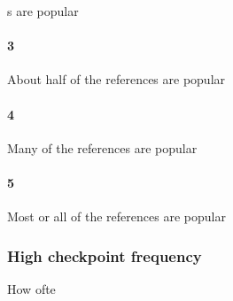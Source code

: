 s are popular\paragraph{3}About half of the references are popular\paragraph{4}Many of the references are popular\paragraph{5}Most or all of the references are popular\subsubsection{High checkpoint frequency}How ofte